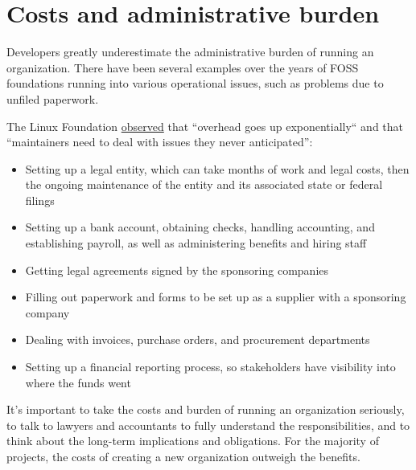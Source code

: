 


\chapter{Costs and administrative burden}

Developers greatly underestimate the administrative burden of running an organization.  There have been several examples over the years of FOSS foundations running into various operational issues, such as problems due to unfiled paperwork.

The Linux Foundation \href{https://www.linuxfoundation.org/blog/the-linux-foundation-its-not-just-the-linux-operating-system/}{observed} that ``overhead goes up exponentially`` and that ``maintainers need to deal with issues they never anticipated'':

\begin{itemize}

\item Setting up a legal entity, which can take months of work and legal costs, then the ongoing maintenance of the entity and its associated state or federal filings

\item Setting up a bank account, obtaining checks, handling accounting, and establishing payroll, as well as administering benefits and hiring staff

\item Getting legal agreements signed by the sponsoring companies

\item Filling out paperwork and forms to be set up as a supplier with a sponsoring company

\item Dealing with invoices, purchase orders, and procurement departments

\item Setting up a financial reporting process, so stakeholders have visibility into where the funds went

\end{itemize}

It's important to take the costs and burden of running an organization seriously, to talk to lawyers and accountants to fully understand the responsibilities, and to think about the long-term implications and obligations.  For the majority of projects, the costs of creating a new organization outweigh the benefits.

